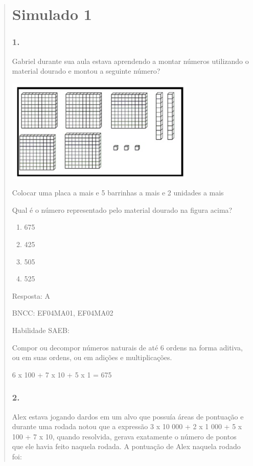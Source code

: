 \begin{enumerate}
\begin{escolha}
\begin{enumerate}
\begin{itemize}
\begin{itemize}
\begin{escolha}
\begin{quote}
\begin{escolha}
{\section{Simulado 1}\label{simulado-1}

\subsubsection{1.}\label{section-143}

Gabriel durante sua aula estava aprendendo a montar números utilizando o
material dourado e montou a seguinte número?

\includegraphics[width=3.55128in,height=1.93600in]{media/image142.png}

Colocar uma placa a mais e 5 barrinhas a mais e 2 unidades a mais

Qual é o número representado pelo material dourado na figura acima?

\begin{enumerate}
\def\labelenumi{\alph{enumi})}
\item
  675
\item
  425
\item
  505
\item
  525
\end{enumerate}

Resposta: A

BNCC: EF04MA01, EF04MA02

Habilidade SAEB:

Compor ou decompor números naturais de até 6 ordens na forma aditiva, ou
em suas ordens, ou em adições e multiplicações.

6 x 100 + 7 x 10 + 5 x 1 = 675

\subsubsection{2.}\label{section-144}

Alex estava jogando dardos em um alvo que possuía áreas de pontuação e
durante uma rodada notou que a expressão 3 x 10 000 + 2 x 1 000 + 5 x
100 + 7 x 10, quando resolvida, gerava exatamente o número de pontos que
ele havia feito naquela rodada. A pontuação de Alex naquela rodado foi:

}
\end{escolha}
\end{quote}
\end{escolha}
\end{itemize}
\end{itemize}
\end{enumerate}
\end{escolha}
\end{enumerate}
